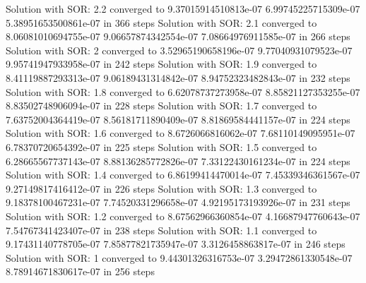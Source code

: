 
 Solution with SOR: 2.2 converged to 9.37015914510813e-07  6.99745225715309e-07  5.38951653500861e-07 in 366 steps
 Solution with SOR: 2.1 converged to 8.06081010694755e-07  9.06657874342554e-07  7.08664976911585e-07 in 266 steps
 Solution with SOR: 2 converged to 3.52965190658196e-07  9.77040931079523e-07  9.95741947933958e-07 in 242 steps
 Solution with SOR: 1.9 converged to 8.41119887293313e-07  9.06189431314842e-07  8.94752323482843e-07 in 232 steps
 Solution with SOR: 1.8 converged to 6.62078737273958e-07  8.85821127353255e-07  8.83502748906094e-07 in 228 steps
 Solution with SOR: 1.7 converged to 7.63752004364419e-07  8.56181711890409e-07  8.81869584441157e-07 in 224 steps
 Solution with SOR: 1.6 converged to 8.6726066816062e-07  7.68110149095951e-07  6.78370720654392e-07 in 225 steps
 Solution with SOR: 1.5 converged to 6.28665567737143e-07  8.88136285772826e-07  7.33122430161234e-07 in 224 steps
 Solution with SOR: 1.4 converged to 6.86199414470014e-07  7.45339346361567e-07  9.27149817416412e-07 in 226 steps
 Solution with SOR: 1.3 converged to 9.18378100467231e-07  7.74520331296658e-07  4.92195173193926e-07 in 231 steps
 Solution with SOR: 1.2 converged to 8.67562966360854e-07  4.16687947760643e-07  7.54767341423407e-07 in 238 steps
 Solution with SOR: 1.1 converged to 9.17431140778705e-07  7.85877821735947e-07  3.3126458863817e-07 in 246 steps
 Solution with SOR: 1 converged to 9.44301326316753e-07  3.29472861330548e-07  8.78914671830617e-07 in 256 steps
